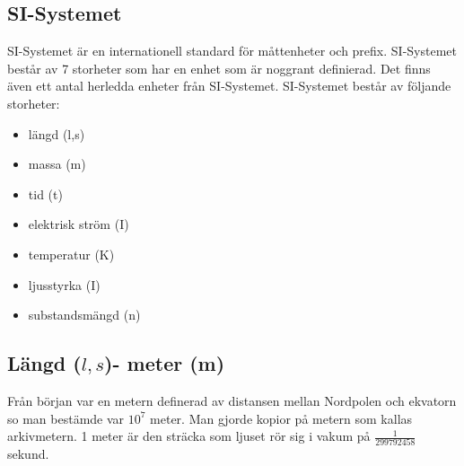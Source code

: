 \documentclass[a4paper,11pt]{article}
\begin{document}
\begin{flushleft}
\section{SI-Systemet}
SI-Systemet är en internationell standard för måttenheter och prefix. SI-Systemet består av 7 storheter som har en enhet som är noggrant definierad. 
Det finns även ett antal herledda enheter från SI-Systemet.\newline
SI-Systemet består av följande storheter:
\begin{itemize}
  \item längd (l,s)
  \item massa (m)
  \item tid (t)
  \item elektrisk ström (I)
  \item temperatur (K)
  \item ljusstyrka (I)
  \item substandsmängd (n)
\end{itemize}

\subsection{Längd ($l,s$)- meter (m)}
Från början var en metern definerad av distansen mellan Nordpolen och ekvatorn so man bestämde var $ 10^7 $ meter.
Man gjorde kopior på metern som kallas arkivmetern.
1 meter är den sträcka som ljuset rör sig i vakum på $ \frac{1}{299792458} $ sekund.
\newline
\newline

\end{flushleft}
\end{document}
